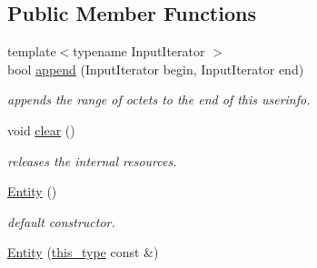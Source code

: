\subsection*{Public Member Functions}
\begin{DoxyCompactItemize}
\item 
\hypertarget{classhryky_1_1uri_1_1userinfo_1_1_entity_a93e94cb484a2594f57fcfc39a3201130}{{\footnotesize template$<$typename Input\-Iterator $>$ }\\bool \hyperlink{classhryky_1_1uri_1_1userinfo_1_1_entity_a93e94cb484a2594f57fcfc39a3201130}{append} (Input\-Iterator begin, Input\-Iterator end)}\label{classhryky_1_1uri_1_1userinfo_1_1_entity_a93e94cb484a2594f57fcfc39a3201130}

\begin{DoxyCompactList}\small\item\em appends the range of octets to the end of this userinfo. \end{DoxyCompactList}\item 
\hypertarget{classhryky_1_1uri_1_1userinfo_1_1_entity_afbd146a6741f1a4d7f50dec7af49a1fd}{void \hyperlink{classhryky_1_1uri_1_1userinfo_1_1_entity_afbd146a6741f1a4d7f50dec7af49a1fd}{clear} ()}\label{classhryky_1_1uri_1_1userinfo_1_1_entity_afbd146a6741f1a4d7f50dec7af49a1fd}

\begin{DoxyCompactList}\small\item\em releases the internal resources. \end{DoxyCompactList}\item 
\hypertarget{classhryky_1_1uri_1_1userinfo_1_1_entity_a04fda53eb83b9be1c78ba9eed12205a9}{\hyperlink{classhryky_1_1uri_1_1userinfo_1_1_entity_a04fda53eb83b9be1c78ba9eed12205a9}{Entity} ()}\label{classhryky_1_1uri_1_1userinfo_1_1_entity_a04fda53eb83b9be1c78ba9eed12205a9}

\begin{DoxyCompactList}\small\item\em default constructor. \end{DoxyCompactList}\item 
\hypertarget{classhryky_1_1uri_1_1userinfo_1_1_entity_a0eb0e026853a061a4f0325e237a44563}{\hyperlink{classhryky_1_1uri_1_1userinfo_1_1_entity_a0eb0e026853a061a4f0325e237a44563}{Entity} (\hyperlink{classhryky_1_1uri_1_1userinfo_1_1_entity_ac4680728d50e274ba5073c9d25c42c06}{this\-\_\-type} const \&)}\label{classhryky_1_1uri_1_1userinfo_1_1_entity_a0eb0e026853a061a4f0325e237a44563}


\end{DoxyCompactItemize}
